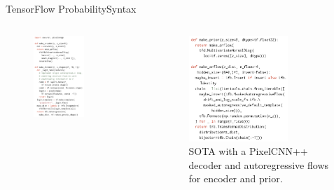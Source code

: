 \documentclass[AERbeamer%
              ,optEnglish%
              ,optBiber%
              ,optBibstyleAlphabetic%
              ,optBeamerClassicFormat%
              ]{AERlatex}%
\begin{document}
\begin{frame}[c]{TensorFlow Probability}{Syntax}
    \centering
    \begin{columns}[T]
        \begin{column}{0.48\textwidth}
            \centering
            \begin{figure}
                \centering
                \includegraphics[width=0.6\textwidth]{TFProbSyntax1.png}
            \end{figure}
        \end{column}
        \begin{column}{0.48\textwidth}
            \centering
            \begin{figure}
                \centering
                \includegraphics[width=0.7\textwidth]{TFProbSyntax2.png}
                \caption{SOTA with a PixelCNN++ decoder and autoregressive flows for encoder and prior.}
            \end{figure}
        \end{column}
    \end{columns}
\end{frame}
\end{document}
